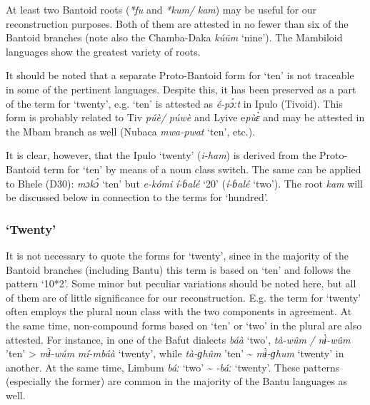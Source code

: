 At least two Bantoid roots (\textit{*fu} and \textit{*kum/} \textit{kam}) may be useful for our reconstruction purposes. Both of them are attested in no fewer than six of the Bantoid branches (note also the Chamba-Daka \textit{k{\'{u}}{\={u}}m} `nine'). The Mambiloid languages show the greatest variety of roots.

It should be noted that a separate Proto-Bantoid form for `ten' is not traceable in some of the pertinent languages. Despite this, it has been preserved as a part of the term for `twenty', e.g. `ten' is attested as \textit{é-p{\'{ɔ}}ːt} in Ipulo (Tivoid). This form is probably related to Tiv \textit{p{\'{u}}è/} \textit{p{\'{u}}wè} and Lyive e\textit{p{\`{u}}{\`{ɛ}}} and may be attested in the Mbam branch as well (Nubaca \textit{mwa-pwat} ‘ten’, etc.).

It is clear, however, that the Ipulo `twenty' (\textit{i-ham}) is derived from the Proto-Bantoid term for `ten' by means of a noun class switch. The same can be applied to Bhele (D30): \textit{mɔk{\'{ɔ}}} ‘ten’ but \textit{e-kómi} \textit{í-ɓalé} ‘20’ (\textit{í-ɓalé} ‘two’). The root \textit{kam} will be discussed below in connection to the terms for `hundred'. 

\clearpage
\subsubsection{‘Twenty’}\label{sec:3.1.1.9}
It is not necessary to quote the forms for `twenty', since in the majority of the Bantoid branches (including Bantu) this term is based on `ten' and follows the pattern ‘10*2’. Some minor but peculiar variations should be noted here, but all of them are of little significance for our reconstruction. E.g. the term for `twenty' often employs the plural noun class with the two components in agreement. At the same time, non-compound forms based on `ten' or `two' in the plural are also attested. For instance, in one of the Bafut dialects \textit{báà} ‘two’, \textit{tà-w{\^{u}}m} \textit{/} \textit{n{\`{ɨ}}-w{\^{u}}m} ’ten’ > \textit{m{\`{ɨ}}-w{\'{u}}m} \textit{mí-mbáà} ‘twenty’, while \textit{tà-ɡh{\^{u}}m} ’ten’ {\textasciitilde} \textit{m{\`{ɨ}}-ɡhum} ‘twenty’ in another. At the same time, Limbum \textit{báː} ‘two’ {\textasciitilde} \textit{{}-báː} ‘twenty’. These patterns (especially the former) are common in the majority of the Bantu languages as well. 

